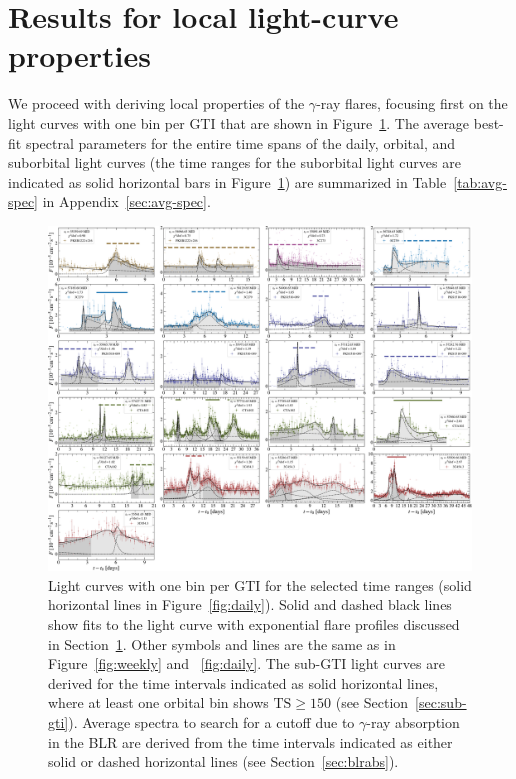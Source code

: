 \documentclass[twocolumn]{aastex62}
\newcommand{\gray}{$\gamma$-ray\xspace}
\begin{document}
\section{Results for local light-curve properties}
\label{sec:results-local}

We proceed with deriving local properties of the \gray flares, focusing first on the light curves with one bin per GTI that are shown in Figure~\ref{fig:gti}.
The average best-fit spectral parameters for the entire time spans of the daily, orbital, and suborbital light curves (the time ranges for the suborbital light curves are indicated as solid horizontal bars in Figure~\ref{fig:gti}) are summarized in Table~\ref{tab:avg-spec} in Appendix~\ref{sec:avg-spec}. 

\begin{figure}
    \centering
    \includegraphics[width = .99\linewidth]{lcfithop_orbit_all_maxiter2_fsys0p00_addcomp0_comb.pdf}
    \caption{ Light curves with one bin per GTI for the selected time ranges (solid horizontal lines in Figure~\ref{fig:daily}). Solid and dashed black lines show fits to the light curve with exponential flare profiles discussed in Section~\ref{sec:results-local}. Other symbols and lines are the same as in Figure~\ref{fig:weekly} and ~\ref{fig:daily}.
    The sub-GTI light curves are derived for the time intervals indicated as solid horizontal lines, where at least one orbital bin shows $\mathrm{TS}\geqslant 150$ (see Section~\ref{sec:sub-gti}). 
    Average spectra to search for a cutoff due to \gray absorption in the BLR are derived from the time intervals indicated as either solid or dashed horizontal lines (see Section~\ref{sec:blrabs}).
    }
    \label{fig:gti}
\end{figure}
\end{document}
